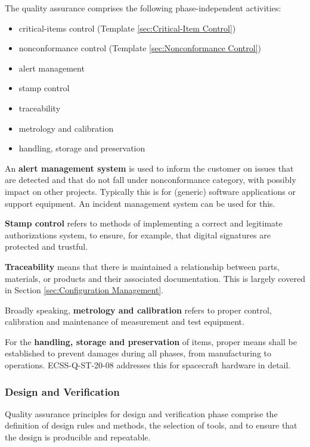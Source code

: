 The quality assurance comprises the following phase-independent activities:

\begin{itemize}
\item critical-items control (Template \ref{sec:Critical-Item Control})
\item nonconformance control (Template \ref{sec:Nonconformance Control})
\item alert management 
\item stamp control
\item traceability 
\item metrology and calibration 
\item handling, storage and preservation

\end{itemize}

An \textbf{alert management system} is used to inform the customer on issues that are detected and that do not fall under nonconformance category, with possibly impact on other projects. Typically this is for (generic) software applications or support equipment. An incident management system can be used for this.

\textbf{Stamp control} refers to methods of implementing a correct and legitimate authorizations system, to ensure, for example, that digital signatures are protected and trustful.

\textbf{Traceability} means that there is maintained a relationship between parts, materials, or products and their associated documentation. This is largely covered in Section \ref{sec:Configuration Management}.

Broadly speaking, \textbf{metrology and calibration} refers to proper control, calibration and maintenance of measurement and test equipment. 

For the \textbf{handling, storage and preservation} of items, proper means shall be established to prevent damages during all phases, from manufacturing to operations. ECSS-Q-ST-20-08 \cite{ECSS-Q-ST-20-08} addresses this for spacecraft hardware in detail.

\subsubsection{Design and Verification}

Quality assurance principles for design and verification phase comprise the definition of design rules and methods, the selection of tools, and to ensure that the design is producible and repeatable.

